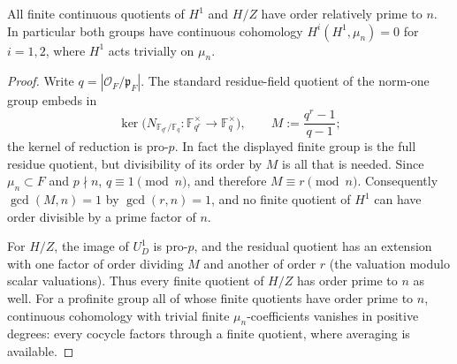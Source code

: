 \begin{lemma}\label{III:lem:prime-to-n}
All finite continuous quotients of $H^1$ and $H/Z$ have order relatively
prime to $n$. In particular both groups have continuous cohomology
$H^i(H^1,\mu_n)=0$ for $i=1,2$, where $H^1$ acts trivially on $\mu_n$.
\end{lemma}
\begin{proof}
Write $q=|\mathcal O_F/\mathfrak p_F|$. The standard residue-field
quotient of the norm-one group embeds in
\[
\ker\bigl(N_{\mathbb F_{q^r}/\mathbb F_q}:
\mathbb F_{q^r}^\times\longrightarrow\mathbb F_q^\times\bigr),
\qquad M:=\frac{q^r-1}{q-1};
\]
the kernel of reduction is pro-$p$. In fact the displayed finite group
is the full residue quotient, but divisibility of its order by $M$ is
all that is needed. Since $\mu_n\subset F$ and $p\nmid n$,
$q\equiv1\pmod n$, and therefore $M\equiv r\pmod n$.
Consequently $\gcd(M,n)=1$ by $\gcd(r,n)=1$, and no finite quotient
of $H^1$ can have order divisible by a prime factor of $n$.

For $H/Z$, the image of $U_D^1$ is pro-$p$, and the residual quotient
has an extension with one factor of order dividing $M$ and another
of order $r$ (the valuation modulo scalar valuations). Thus every
finite quotient of $H/Z$ has order prime to $n$ as well.
For a profinite group all of whose finite quotients have order
prime to $n$, continuous cohomology with trivial finite
$\mu_n$-coefficients vanishes in positive degrees: every cocycle
factors through a finite quotient, where averaging is available.
\end{proof}

